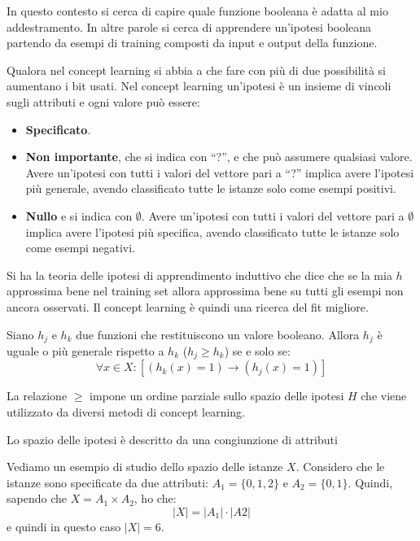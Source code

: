 In questo contesto si cerca di capire quale funzione booleana è adatta al mio
addestramento. In altre parole si cerca di apprendere un'ipotesi booleana partendo
da esempi di training composti da input e output della funzione.

Qualora nel concept learning si abbia a che fare con più di due possibilità si
aumentano i bit usati. Nel concept learning un'ipotesi è un insieme di vincoli
sugli attributi e ogni valore può essere:
\begin{itemize}
    \item \textbf{Specificato}.
    \item \textbf{Non importante}, che si indica con “?”, e che può assumere
          qualsiasi valore. Avere un'ipotesi con tutti i valori del vettore pari a “?”
          implica avere l’ipotesi più generale, avendo classificato tutte le istanze
          solo come esempi positivi.
    \item \textbf{Nullo} e si indica con $\emptyset$. Avere un'ipotesi con tutti
          i valori del vettore pari a $\emptyset$ implica avere l'ipotesi più specifica,
          avendo classificato tutte le istanze solo come esempi negativi.
\end{itemize}

Si ha la teoria delle ipotesi di apprendimento induttivo che dice che se la mia
$h$ approssima bene nel training set allora approssima bene su tutti gli esempi
non ancora osservati. Il concept learning è quindi una ricerca del fit migliore.

\begin{definizione}
    Siano $h_j$ e $h_k$ due funzioni che restituiscono un valore booleano.
    Allora $h_j$ è uguale o più generale rispetto a $h_k$ ($h_j \geq h_k$) se e solo se:
    \begin{equation}
        \forall x \in X: [(h_k(x) = 1) \to (h_j(x) = 1)]
    \end{equation}

    La relazione $\geq$ impone un ordine parziale sullo spazio delle ipotesi
    $H$ che viene utilizzato da diversi metodi di concept learning.

    Lo spazio delle ipotesi è descritto da una congiunzione di attributi
\end{definizione}

Vediamo un esempio di studio dello spazio delle istanze $X$. Considero che le
istanze sono specificate da due attributi: $A_1 = \{0, 1, 2\}$ e $A_2 = \{0, 1\}$.
Quindi, sapendo che $X = A_1 \times A_2$, ho che: $$|X| = |A_1| \cdot |A2|$$ e
quindi in questo caso $|X| = 6$.

